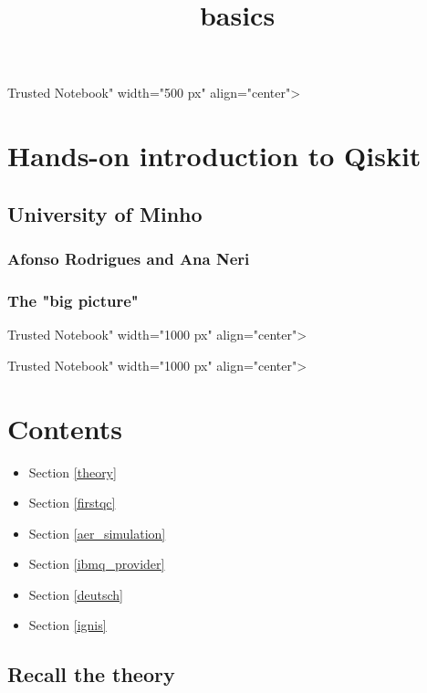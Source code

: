 \documentclass[11pt]{article}
\title{basics}
\providecommand{\tightlist}{%
      \setlength{\itemsep}{0pt}\setlength{\parskip}{0pt}}
\begin{document}
    
    
    \maketitle
    
    

    
     Trusted Notebook" width="500 px" align="center"\textgreater{}

\section{Hands-on introduction to
Qiskit}\label{hands-on-introduction-to-qiskit}

\subsection{University of Minho}\label{university-of-minho}

\subsubsection{Afonso Rodrigues and Ana
Neri}\label{afonso-rodrigues-and-ana-neri}

    \subsubsection{The "big picture"}\label{the-big-picture}

 Trusted Notebook" width="1000 px" align="center"\textgreater{}

     Trusted Notebook" width="1000 px" align="center"\textgreater{}

    \section{Contents}\label{contents}

\begin{itemize}
\tightlist
\item
  Section \ref{theory}
\item
  Section \ref{firstqc}
\item
  Section \ref{aer_simulation}
\item
  Section \ref{ibmq_provider}
\item
  Section \ref{deutsch}
\item
  Section \ref{ignis}
\end{itemize}

    \subsection{Recall the theory}\label{recall-the-theory}
\end{document}
